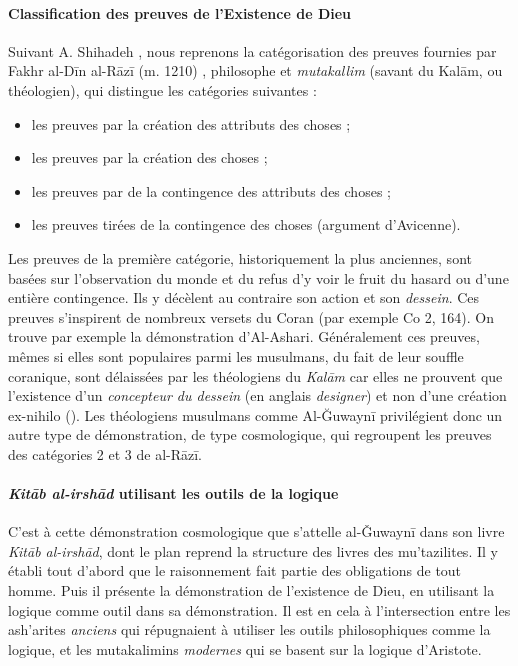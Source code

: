 \paragraph{Classification des preuves de l'Existence de Dieu} 
Suivant A. Shihadeh \cite[198]{Cambridge:ClassicalIslamicTheology}, nous reprenons la catégorisation des preuves fournies par Fakhr al-Dīn al-Rāzī (m. 1210) , philosophe et \textit{mutakallim} (savant du Kalām, ou théologien), qui distingue les catégories suivantes : 
\begin{itemize}
    \item les preuves par la création des attributs des choses  ;   
    \item les preuves par la création des choses ;    
    \item les preuves par de la contingence des attributs des choses   ;  
    \item les preuves tirées de la contingence des choses (argument d'Avicenne).   
\end{itemize}
Les preuves de la première catégorie, historiquement la plus anciennes,  sont basées sur l'observation du monde et du refus d'y voir le fruit du hasard ou d'une entière contingence. Ils y décèlent au contraire son action et son \textit{dessein}. Ces preuves s'inspirent de nombreux versets du Coran (par exemple Co 2, 164). On trouve par exemple la démonstration d'Al-Ashari. Généralement ces preuves, mêmes si elles sont populaires parmi les musulmans, du fait de leur souffle coranique, sont délaissées par les théologiens du \textit{Kalām} car elles ne prouvent que l'existence d'un \textit{concepteur du dessein} (en anglais \textit{designer}) et non d'une création ex-nihilo (\cite[p.204]{Cambridge:ClassicalIslamicTheology}). Les théologiens musulmans comme Al-Ğuwaynī privilégient donc un autre type de démonstration, de type cosmologique, qui regroupent les preuves des catégories 2 et 3 de al-Rāzī.

\paragraph{\emph{Kitāb al-irshād} utilisant les outils de la logique} C'est à cette démonstration cosmologique que s'attelle  al-Ǧuwaynī dans son livre \textit{Kitāb al-irshād}, dont le plan reprend la structure des livres des   mu'tazilites. Il y établi tout d'abord que le raisonnement fait partie des obligations de tout homme. Puis il présente la démonstration de l'existence de Dieu, en utilisant la logique comme outil dans sa démonstration. Il est en cela à l'intersection entre les ash'arites \textit{anciens} qui répugnaient à utiliser les outils philosophiques comme la logique, et les mutakalimins \textit{modernes} qui se basent sur la logique d'Aristote.

